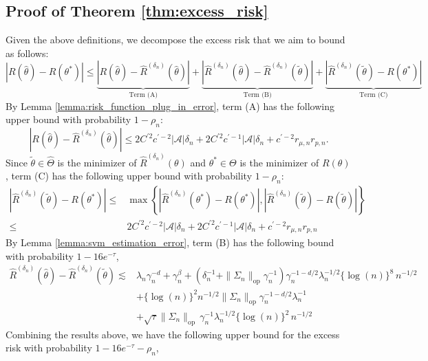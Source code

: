 \documentclass[12pt]{article}
\begin{document}
\subsection{Proof of Theorem \ref{thm:excess_risk}}
Given the above definitions, we decompose the excess risk that we aim to bound as follows:
\begin{equation}\label{eq:excess_risk_decomposition}
   |R(\widehat\theta)-R\left(\theta^*\right)|\leq \underbrace{|R(\widehat\theta)-\widehat R^{({\delta_n})}(\widehat\theta)|}_{\text{Term (A)}} + \underbrace{|\widehat R^{({\delta_n})}(\widehat\theta) - \widehat R^{({\delta_n})}(\tilde\theta)|}_{\text{Term (B)}} + \underbrace{|\widehat R^{({\delta_n})}(\tilde\theta) - R(\theta^*)|}_{\text{Term (C)}} 
\end{equation}
By Lemma \ref{lemma:risk_function_plug_in_error}, term (A) has the following upper bound with probability $1-\rho_n$:
$$|R(\widehat\theta)-\widehat R^{({\delta_n})}(\widehat\theta)|\leq 2C^{\prime2}c^{\prime-2}|\mathcal{A}|\delta_n +2C^{\prime2}c^{\prime-1}|\mathcal{A}|\delta_n + c^{\prime-2}r_{\mu,n}r_{p,n}. $$
Since $\tilde\theta\in \widehat \Theta$ is the minimizer of $\widehat R^{({\delta_n})}(\theta)$ and $\theta^*\in \Theta$ is the minimizer of $R(\theta)$, term (C) has the following upper bound with probability $1-\rho_n$:
\begin{align*}
    |\widehat R^{({\delta_n})}(\tilde\theta) - R(\theta^*)|\leq &\max\left\{|\widehat R^{({\delta_n})}(\theta^*) - R(\theta^*)|,|\widehat R^{({\delta_n})}(\tilde\theta) - R(\tilde\theta)|\right\} \\
    \leq &2C^{\prime2}c^{\prime-2}|\mathcal{A}|\delta_n +2C^{\prime2}c^{\prime-1}|\mathcal{A}|\delta_n + c^{\prime-2}r_{\mu,n}r_{p,n}
\end{align*}
By Lemma \ref{lemma:svm_estimation_error}, term (B) has the following bound with probability $1-16e^{-\tau}$,
\begin{align*}
   \widehat R^{({\delta_n})}(\widehat\theta) - \widehat R^{({\delta_n})}(\tilde\theta)\lesssim & \lambda_n\gamma_n^{-d} + \gamma_n^{\beta} + \left(\delta_n^{-1}+\|\Sigma_n\|_{\mathrm{op}}\gamma_n^{-1}\right)\gamma_n^{-1-d/2}\lambda_n^{-1/2}\{\log(n)\}^{8}\,n^{-1/2}\\
& + \{\log(n)\}^2 n^{-1/2}\|\Sigma_n\|_{\mathrm{op}}\gamma_n^{-1-d/2}\lambda_n^{-1}\\
& + \sqrt{\tau} \|\Sigma_n\|_{\mathrm{op}}\,\gamma_n^{-1}\lambda_n^{-1/2}\{\log(n)\}^2\,n^{-1/2}
\end{align*}
Combining the results above, we have the following upper bound for the excess risk with probability $1-16e^{-\tau} - \rho_n$,
\end{document}
